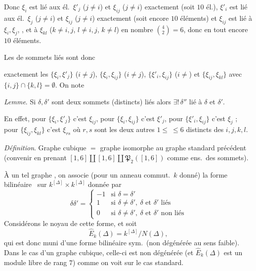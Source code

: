 \documentclass[11pt,a4paper]{article}
\begin{document}
Donc $\xi_i$ est lié aux él.\ $\xi'_j$ ($j \neq i$) et $\xi_{ij}$ ($j \neq
i$) exactement (soit $10$ él.), $\xi'_i$ est lié aux él.\ $\xi_j$ ($j \neq
i$) et $\xi_{ij}$ ($j \neq i$) exactement (soit encore $10$ éléments) et
$\xi_{ij}$  est lié à $\xi_i, \xi_j$, , et à $\xi_{kl}$ ($k \neq i, j$, $l \neq i, j$, $k \neq l$) en
nombre $\binom{4}{2} = 6$, donc en tout encore $10$ éléments.
\struck{\ill{}}

Les   de sommets liés sont donc

exactement les $\{\xi_i, \xi'_j\}$ ($i \neq j$), $\{\xi_i, \xi_{ij}\}$ ($i
\neq j$), $\{\xi'_i, \xi_{ij}\}$ ($i \neq$\ill{}) et $\{\xi_{ij},
\xi_{kl}\}$ avec $\{i,j\} \cap \{k,l\} = \emptyset$. On note 

\emph{Lemme}. Si $\delta, \delta'$ sont deux sommets (distincts) liés alors
$\exists!\, \delta''$ lié à $\delta$ et $\delta'$.

En effet, pour $\{\xi_i, \xi'_j\}$ c'est $\xi_{ij}$, pour $\{\xi_i,
\xi_{ij}\}$ c'est $\xi'_j$, pour $\{\xi'_i, \xi_{ij}\}$ c'est $\xi_j$ ; pour
$\{\xi_{ij}, \xi_{kl}\}$ c'est $\xi_{rs}$ où $r, s$ sont les deux autres
 $1 \leq \ \leq 6$ distincts des $i, j, k, l$.

\emph{Définition}. Graphe cubique $=$ graphe isomorphe au graphe standard
précédent (convenir en prenant $[1,6] \amalg [1,6] \amalg
\mathfrak{P}_2([1,6])$ comme ens.\ des sommets).

À un tel graphe ,
on associe (pour un anneau commut.\ $k$ donné) la forme bilinéaire
\ sur $k^{[\Delta]} \times k^{[\Delta]}$ donnée par
\[
\delta\delta' =
\begin{cases}
-1 & \text{si } \delta = \delta' \\
1 & \text{si } \delta \neq \delta', \ \delta \text{ et } \delta' \text{ liés} \\
0 & \text{si } \delta \neq \delta', \ \delta \text{ et } \delta' \text{ non liés}
\end{cases}
\]
Considérons le noyau  de cette forme, et soit
\[
\widehat{E}_k(\Delta) = k^{[\Delta]} / N(\Delta),
\]
qui est donc muni d'une forme bilinéaire sym.\ (non dégénérée au sens
faible). Dans le cas d'un graphe cubique, celle-ci est non dégénérée (et
$\widehat{E}_k(\Delta)$ est un module libre de rang $7$) comme on voit sur
le cas standard.
\end{document}
